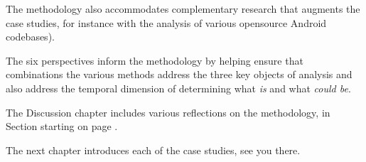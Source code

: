 The methodology also accommodates complementary research that augments the case studies, for instance with the analysis of various opensource Android codebases).

The six perspectives inform the methodology by helping ensure that combinations the various methods address the three key objects of analysis and also address the temporal dimension of determining what \textit{is} and what \textit{could be}.

The Discussion chapter includes various reflections on the methodology, in Section  starting on page \pageref{discussion-on-methodology-and-case-study-procedure}.

The next chapter introduces each of the case studies, see you there.